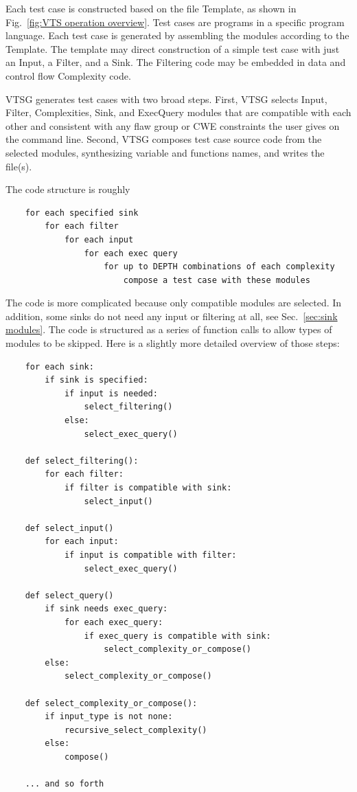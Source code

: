 \documentclass[12pt]{article}
\begin{document}
Each test case is constructed based on the file Template, as shown
in Fig.~\ref{fig:VTS operation overview}. Test cases are 
programs in a specific program language.  
Each test case is generated by
assembling the modules according to the Template.  The
template may direct construction of a simple test case with just
an Input, a Filter, and a Sink.  
The Filtering code may be embedded in data and control flow
Complexity code.

VTSG generates test cases with two broad steps.  First, VTSG selects
Input, Filter, Complexities, Sink, and ExecQuery modules that are
compatible with each other and consistent with any flaw group or
CWE constraints the user gives on the command line.  Second, VTSG
composes test case source code from the selected modules, 
synthesizing variable and functions names, and writes the file(s).

The code structure is roughly
\begin{verbatim}
    for each specified sink
        for each filter
            for each input
                for each exec query
                    for up to DEPTH combinations of each complexity
                        compose a test case with these modules
\end{verbatim}
The code is more complicated because only compatible modules are 
selected.
In addition, some sinks do not need any input or filtering at all,
see Sec.~\ref{sec:sink modules}.
The
code is structured as a series of function calls to allow types
of modules to be skipped.  Here is a slightly more detailed
overview of those steps:
\begin{verbatim}
    for each sink:
        if sink is specified:
            if input is needed:
                select_filtering()
            else:
                select_exec_query()
    
    def select_filtering():
        for each filter:
            if filter is compatible with sink:
                select_input()
    
    def select_input()
        for each input:
            if input is compatible with filter:
                select_exec_query()

    def select_query()
        if sink needs exec_query:
            for each exec_query:
                if exec_query is compatible with sink:
                    select_complexity_or_compose()
        else:
            select_complexity_or_compose()

    def select_complexity_or_compose():
        if input_type is not none:
            recursive_select_complexity()
        else:
            compose()

    ... and so forth
\end{verbatim}
\end{document}
